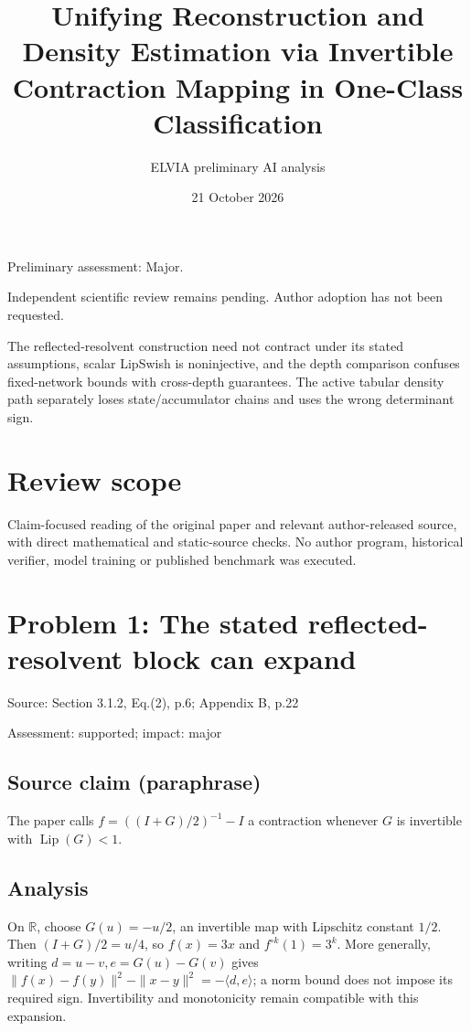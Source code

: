 \documentclass[11pt]{article}
\begin{document}
\title{Unifying Reconstruction and Density Estimation via Invertible Contraction Mapping in One-Class Classification}

\author{ELVIA preliminary AI analysis}\date{21 October 2026}\maketitle

Preliminary assessment: Major.\par

Independent scientific review remains pending. Author adoption has not been requested.

The reflected-resolvent construction need not contract under its stated assumptions, scalar LipSwish is noninjective, and the depth comparison confuses fixed-network bounds with cross-depth guarantees. The active tabular density path separately loses state/accumulator chains and uses the wrong determinant sign.

\section*{Review scope}

Claim-focused reading of the original paper and relevant author-released source, with direct mathematical and static-source checks. No author program, historical verifier, model training or published benchmark was executed.

\section*{Problem 1: The stated reflected-resolvent block can expand}

Source: Section 3.1.2, Eq.(2), p.6; Appendix B, p.22

Assessment: supported; impact: major

\subsection*{Source claim (paraphrase)}

The paper calls \(f=((I+G)/2)^{-1}-I\) a contraction whenever \(G\) is invertible with \(\operatorname{Lip}(G)<1\).

\subsection*{Analysis}

On \(\mathbb R\), choose \(G(u)=-u/2\), an invertible map with Lipschitz constant \(1/2\). Then \((I+G)/2=u/4\), so \(f(x)=3x\) and \(f^{\circ k}(1)=3^k\). More generally, writing \(d=u-v,e=G(u)-G(v)\) gives \(\|f(x)-f(y)\|^2-\|x-y\|^2=-\langle d,e\rangle\); a norm bound does not impose its required sign. Invertibility and monotonicity remain compatible with this expansion.
\end{document}
